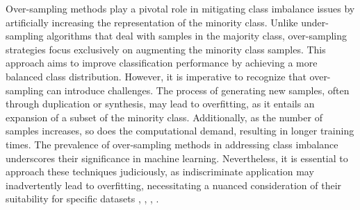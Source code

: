 Over-sampling methods play a pivotal role in mitigating class imbalance issues by artificially increasing the representation of the minority class. Unlike under-sampling algorithms that deal with samples in the majority class, over-sampling strategies focus exclusively on augmenting the minority class samples. This approach aims to improve classification performance by achieving a more balanced class distribution. However, it is imperative to recognize that over-sampling can introduce challenges. The process of generating new samples, often through duplication or synthesis, may lead to overfitting, as it entails an expansion of a subset of the minority class. Additionally, as the number of samples increases, so does the computational demand, resulting in longer training times. The prevalence of over-sampling methods in addressing class imbalance underscores their significance in machine learning. Nevertheless, it is essential to approach these techniques judiciously, as indiscriminate application may inadvertently lead to overfitting, necessitating a nuanced consideration of their suitability for specific datasets \cite{Khushi2021}, \cite{Tarawneh2022}, \cite{Xu2020}, \cite{Liu2022}.

